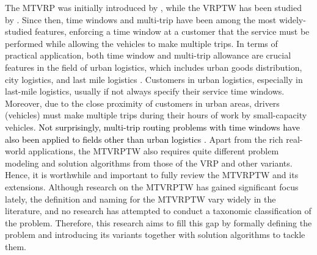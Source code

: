 \documentclass[11pt]{article}
\newcommand\addb[1]{\textcolor{black}{#1}}
\begin{document}
The MTVRP was initially introduced by \cite{fleischmann1990vehicle}, while the VRPTW has been studied by \cite{kolen1987vehicle}. Since then, time windows and multi-trip have been among the most widely-studied features, enforcing a time window at a customer that the service must be performed while allowing the vehicles to make multiple trips.  In terms of practical application, both time window and multi-trip allowance are crucial features in the field of urban logistics, which includes urban goods distribution, city logistics, and last mile logistics \citep{cardenas2017city}.  Customers in urban logistics, especially in last-mile logistics, usually if not always specify their service time windows.  Moreover, due to the close proximity of customers in urban areas, drivers (vehicles) must make multiple trips during their hours of work by small-capacity vehicles.  \addb{Not surprisingly, multi-trip routing problems with time windows have also been applied to fields other than urban logistics \citep[see, e.g.,][]{christiansen2017operational, liu2018branch, tang2015exact}.}  Apart from the rich real-world applications, the MTVRPTW also requires quite different problem modeling and solution algorithms from those of the VRP and other variants.  Hence, it is worthwhile and important to fully review the MTVRPTW and its extensions.  Although research on the MTVRPTW has gained significant focus lately, the definition and naming for the MTVRPTW vary widely in the literature, and no research has attempted to conduct a taxonomic classification of the problem.  Therefore, this research aims to fill this gap by formally defining the problem and introducing its variants together with solution algorithms to tackle them.
\newline

\end{document}
